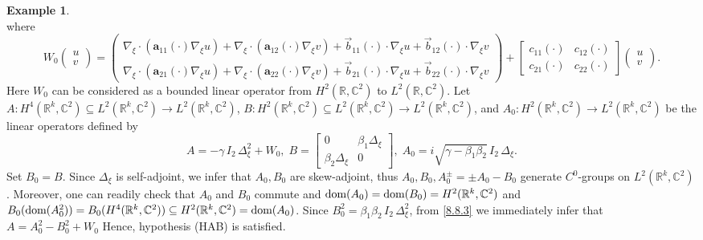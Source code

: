 \documentclass[11pt]{amsart}
\numberwithin{equation}{section}
\newcommand\R{\mathbb R}
\newcommand\C{\mathbb C}
\theoremstyle{remark}
\theoremstyle{definition}
\newtheorem{example}[theorem]{Example}
\newcommand{\dom}{\text{\rm{dom}}}
\begin{document}
\begin{example}
\begin{equation}
	\end{equation}
	where
	\begin{equation}\label{8.8.2}
		W_0\begin{pmatrix}u\\v\end{pmatrix}
		= \begin{pmatrix}
			\nabla_\xi\cdot(\mathbf{a}_{11}(\cdot)\nabla_\xi u) + \nabla_\xi\cdot(\mathbf{a}_{12}(\cdot)\nabla_\xi v)
			+ \vec{b}_{11}(\cdot)\cdot\nabla_\xi u + \vec{b}_{12}(\cdot)\cdot\nabla_\xi v\\
			\nabla_\xi\cdot(\mathbf{a}_{21}(\cdot)\nabla_\xi u) + \nabla_\xi\cdot(\mathbf{a}_{22}(\cdot)\nabla_\xi v)
			+ \vec{b}_{21}(\cdot)\cdot\nabla_\xi u + \vec{b}_{22}(\cdot)\cdot\nabla_\xi v
		\end{pmatrix}
		+ \begin{bmatrix}c_{11}(\cdot) & c_{12}(\cdot)\\ c_{21}(\cdot) & c_{22}(\cdot)\end{bmatrix}
		\begin{pmatrix}u\\v\end{pmatrix}.
	\end{equation}
	Here $W_0$ can be considered as a bounded linear operator from $H^2(\R,\C^2)$ to $L^2(\R,\C^2)$. Let $A: H^4(\R^k,\C^2) \subseteq L^2(\R^k,\C^2) \to L^2(\R^k,\C^2)$, $B: H^2(\R^k,\C^2) \subseteq L^2(\R^k,\C^2) \to L^2(\R^k,\C^2)$,
	and
	$A_0: H^2(\R^k,\C^2) \to L^2(\R^k,\C^2)$ be the linear operators defined by 
	\begin{equation}\label{8.8.3}
		A = -\gamma\,I_2\,\Delta_\xi^2 + W_0,\;B= \begin{bmatrix}0 & \beta_1\Delta_\xi\\\beta_2\Delta_\xi & 0\end{bmatrix},\;A_0 = i\sqrt{\gamma - \beta_1\beta_2}\,I_2\,\Delta_\xi.
	\end{equation}
	Set $B_0=B$. Since $\Delta_\xi$ is self-adjoint, we infer that $A_0, B_0$ are skew-adjoint, thus
	$A_0, B_0, A_0^\pm = \pm A_0 - B_0$
	generate $C^0$-groups on $L^2(\R^k,\C^2)$. Moreover, one can readily check that $A_0$ and
	$B_0$ commute and $\dom(A_0) = \dom(B_0) = H^2(\R^k,\C^2)$ and
	$B_0(\dom(A_0^2)) = B_0(H^4(\R^k,\C^2)) \subseteq H^2(\R^k,\C^2) = \dom(A_0)$. Since $B_0^2=\beta_1\beta_2\,I_2\,\Delta_\xi^2$, from \eqref{8.8.3} we immediately infer that $A=A_0^2-B_0^2+W_0$
	Hence, hypothesis (HAB) is satisfied.
\end{example}
\end{document}
